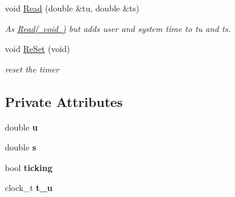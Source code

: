 \begin{DoxyCompactItemize}
\mbox{\label{class_o_p_ttypes__di__unipi__it_1_1_o_p_ttimers_aa65ca7b54ac601a3e2d7c00c9f2c1aa6}} 
void \mbox{\hyperlink{class_o_p_ttypes__di__unipi__it_1_1_o_p_ttimers_aa65ca7b54ac601a3e2d7c00c9f2c1aa6}{Read}} (double \&tu, double \&ts)
\begin{DoxyCompactList}\small\item\em As \mbox{\hyperlink{class_o_p_ttypes__di__unipi__it_1_1_o_p_ttimers_af0ce31a284ab2dedf9cede10bc3ccce0}{Read( void )}} but {\itshape adds} user and system time to tu and ts. \end{DoxyCompactList}\item 
\mbox{\label{class_o_p_ttypes__di__unipi__it_1_1_o_p_ttimers_a83cd017adcfdb6d5b0a66aea8f6508b6}} 
void \mbox{\hyperlink{class_o_p_ttypes__di__unipi__it_1_1_o_p_ttimers_a83cd017adcfdb6d5b0a66aea8f6508b6}{Re\+Set}} (void)
\begin{DoxyCompactList}\small\item\em reset the timer \end{DoxyCompactList}\end{DoxyCompactItemize}
\subsection*{Private Attributes}
\begin{DoxyCompactItemize}
\item 
\mbox{\label{class_o_p_ttypes__di__unipi__it_1_1_o_p_ttimers_aed08c8478a62910aab06ba708a0e5b5f}} 
double {\bfseries u}
\item 
\mbox{\label{class_o_p_ttypes__di__unipi__it_1_1_o_p_ttimers_ad62e712560f6344b96d4c080a2ba9c92}} 
double {\bfseries s}
\item 
\mbox{\label{class_o_p_ttypes__di__unipi__it_1_1_o_p_ttimers_a77498b581bd1eb381b0da076d019b029}} 
bool {\bfseries ticking}
\item 
\mbox{\label{class_o_p_ttypes__di__unipi__it_1_1_o_p_ttimers_a874e836d3ca762b5c9d16f1e19c7e9ce}} 
clock\+\_\+t {\bfseries t\+\_\+u}
\end{DoxyCompactItemize}


